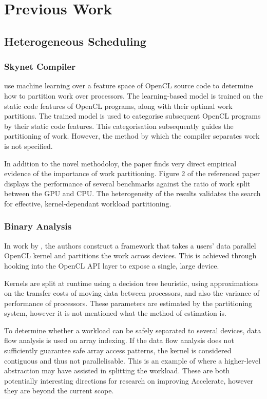 \documentclass[a4paper,12pt]{article}
\begin{document}
\section{Previous Work}

\subsection{Heterogeneous Scheduling}

\subsubsection*{Skynet Compiler}
\citet*{grewe_static_????} use machine learning over a feature space of OpenCL source code to determine how to partition work over processors.
The learning-based model is trained on the static code features of OpenCL programs, along with their optimal work partitions.
The trained model is used to categorise subsequent OpenCL programs by their static code features.
This categorisation subsequently guides the partitioning of work.
However, the method by which the compiler separates work is not specified.

In addition to the novel methodoloy, the paper finds very direct empirical evidence of the importance of work partitioning.
Figure 2 of the referenced paper displays the performance of several benchmarks against the ratio of work split between the GPU and CPU.
The heterogeneity of the results validates the search for effective, kernel-dependant workload partitioning.

\subsubsection*{Binary Analysis}
In work by \citet*{lee_transparent_2013}, the authors construct a framework that takes a users' data parallel OpenCL kernel and partitions the work across devices.
This is achieved through hooking into the OpenCL API layer to expose a single, large device.

Kernels are split at runtime using a decision tree heuristic, using approximations on the transfer costs of moving data between processors, and also the variance of performance of processors.
These parameters are estimated by the partitioning system, however it is not mentioned what the method of estimation is.

To determine whether a workload can be safely separated to several devices, data flow analysis is used on array indexing.
If the data flow analysis does not sufficiently guarantee safe array access patterns, the kernel is considered contiguous and thus not parallelisable.
This is an example of where a higher-level abstraction may have assisted in splitting the workload.
These are both potentially interesting directions for research on improving Accelerate, however they are beyond the current scope.
\end{document}
